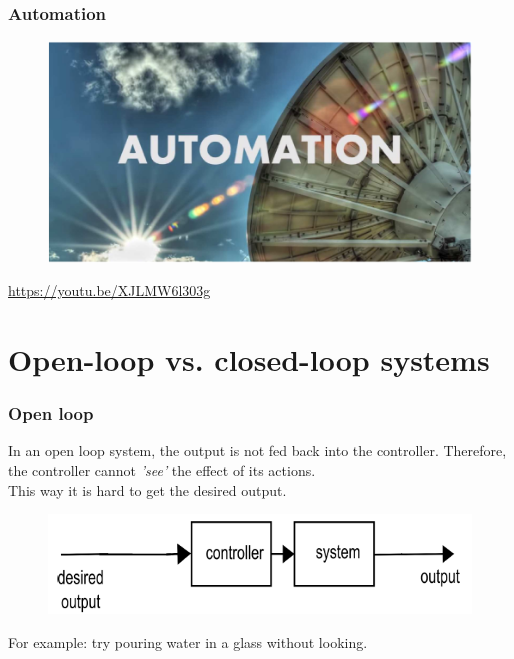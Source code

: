 \documentclass{beamer}
\begin{document}

\begin{frame}
\frametitle{Automation}
\begin{figure}
\includegraphics[width=1\linewidth]{automation}
\end{figure}
\url{https://youtu.be/XJLMW6l303g}
\end{frame}

\section{Open-loop vs. closed-loop systems} 

\begin{frame}
\frametitle{Open loop}
In an open loop system, the output is not fed back into the controller. Therefore, the controller cannot \textit{'see'} the effect of its actions. \\
This way it is hard to get the desired output.\\
\medskip
\begin{figure}
\includegraphics[width=1\linewidth]{open_loop2}
\end{figure}
\bigskip
For example: try pouring water in a glass without looking.
\end{frame}

\end{document}

